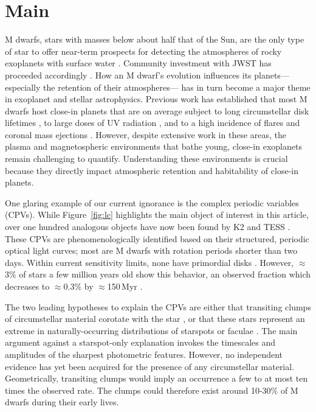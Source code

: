 \documentclass{nature3}
\begin{document}

\section{Main}
\label{sec:main}

M dwarfs, stars with masses below about half that of the Sun, are the
only type of star to offer near-term prospects for detecting the
atmospheres of rocky exoplanets with surface water \cite{NAP26141}.
Community investment with JWST has proceeded accordingly
\cite{Redfield2024,TRAPPIST1JWSTCommunityInitiative2024}.  How an M
dwarf's evolution influences its planets---especially the retention of
their atmospheres--- has in turn become a major theme in
exoplanet and stellar astrophysics.  Previous work has established
that most M dwarfs host close-in planets \cite{Dressing2015} that are
on average subject to long circumstellar disk lifetimes
\cite{Ribas2015}, to large doses of UV radiation \cite{France2013},
and to a high incidence of flares and coronal mass ejections
\cite{Gunther2020}.  However, despite extensive work in these areas,
the plasma and magnetospheric environments that bathe young, close-in
exoplanets remain challenging to quantify.
Understanding these environments is crucial because they directly
impact atmospheric retention and habitability of close-in planets.

One glaring example of our current ignorance is the complex periodic
variables (CPVs).  While Figure~\ref{fig:lc} highlights the main
object of interest in this article, over one hundred analogous objects
have now been found by K2 and TESS
\cite{Rebull2016,Stauffer2017,Rebull2018,Zhan2019,Rebull2020,Bouma2024}.
These CPVs are phenomenologically identified based on their
structured, periodic optical light curves; most are M dwarfs with
rotation periods shorter than two days.  Within current sensitivity
limits, none have primordial disks \cite{Stauffer2017,Bouma2024}.
However, $\approx$3\% of stars a few million years old show this
behavior, an  observed fraction which decreases to $\approx$0.3\% by
$\approx$150\,Myr \cite{Rebull2020}.

The two leading hypotheses to explain the CPVs are either that
transiting clumps of circumstellar material corotate with the star
\cite{Stauffer2017,Gunther2022,Bouma2024}, or that these stars
represent an extreme in naturally-occurring distributions of starspots
or faculae \cite{Koen2021}.  The main argument against a starspot-only
explanation invokes the timescales and amplitudes of the sharpest
photometric features.  However, no independent evidence has yet been
acquired for the presence of any circumstellar material.
Geometrically, transiting clumps would imply an occurrence a few to at
most ten times the observed rate.  The clumps could therefore exist
around 10-30\% of M dwarfs during their early lives.
\end{document}
